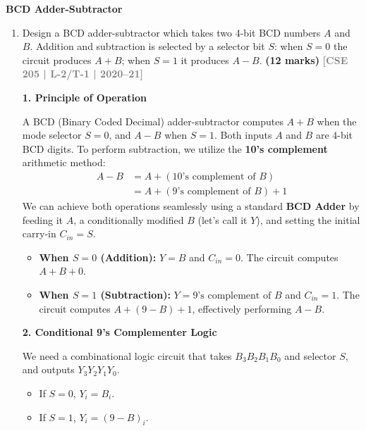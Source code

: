 \documentclass[12pt,a3paper]{article}
\newcommand{\yr}[1]{\hfill\textcolor{gray}{\small\textbf{[#1]}}}
\newcommand{\mk}[1]{\textcolor{orange!70!black}{\small\textbf{(#1 marks)}}}
\newcommand{\subtopic}[2]{%
  \vspace{10pt}
  \noindent\begin{tcolorbox}[colback=#1!8,colframe=#1,boxrule=0.6pt,arc=4pt,
    left=6pt,right=6pt,top=4pt,bottom=4pt]
    \small\bfseries\textcolor{#1}{#2}
  \end{tcolorbox}
  \vspace{2pt}
}
\begin{document}
\subtopic{cD}{BCD Adder-Subtractor}
\label{sub:s4-bcd-addsub}

\begin{enumerate}


\item Design a BCD adder-subtractor which takes two 4-bit BCD numbers $A$ and $B$. Addition and subtraction is selected by a selector bit $S$: when $S=0$ the circuit produces $A+B$; when $S=1$ it produces $A-B$.
\mk{12} \yr{CSE 205 | L-2/T-1 | 2020--21}

\begin{tcolorbox}[enhanced,breakable,ansbox,colback=cD!4,colframe=cD,boxrule=0.8pt,arc=5pt,title={\textbf{Answer}},fonttitle=\bfseries\color{white},colbacktitle=cD]

\textbf{\textcolor{cD}{1. Principle of Operation}}

A BCD (Binary Coded Decimal) adder-subtractor computes $A + B$ when the mode selector $S = 0$, and $A - B$ when $S = 1$. Both inputs $A$ and $B$ are 4-bit BCD digits. To perform subtraction, we utilize the \textbf{10's complement} arithmetic method:
\begin{align*}
    A - B &= A + (\text{10's complement of } B) \\
          &= A + (\text{9's complement of } B) + 1
\end{align*}
We can achieve both operations seamlessly using a standard \textbf{BCD Adder} by feeding it $A$, a conditionally modified $B$ (let's call it $Y$), and setting the initial carry-in $C_{in} = S$.
\begin{itemize}
    \item \textbf{When $S = 0$ (Addition):} $Y = B$ and $C_{in} = 0$. The circuit computes $A + B + 0$.
    \item \textbf{When $S = 1$ (Subtraction):} $Y = \text{9's complement of } B$ and $C_{in} = 1$. The circuit computes $A + (9 - B) + 1$, effectively performing $A - B$.
\end{itemize}

\vspace{1em}
\textbf{\textcolor{cD}{2. Conditional 9's Complementer Logic}}

We need a combinational logic circuit that takes $B_3B_2B_1B_0$ and selector $S$, and outputs $Y_3Y_2Y_1Y_0$. 
\begin{itemize}
    \item If $S = 0$, $Y_i = B_i$.
    \item If $S = 1$, $Y_i = (9 - B)_i$.
\end{itemize}


\end{tcolorbox}
\end{enumerate}
\end{document}

